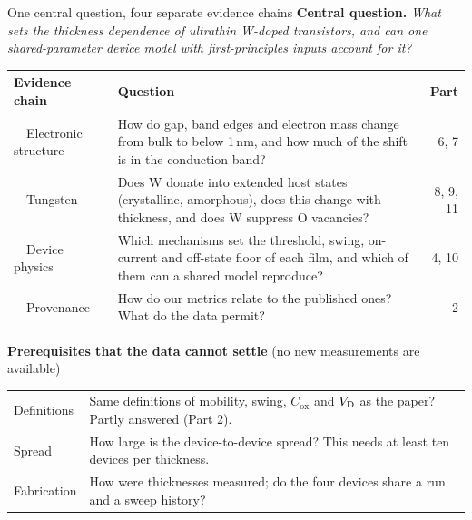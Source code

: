 \begin{frame}{One central question, four separate evidence chains}
  \threeTop
  \begingroup\small\textbf{Central question.} \emph{What sets the thickness dependence of ultrathin W-doped \InO{}
    transistors, and can one shared-parameter device model with first-principles inputs account for it?}\par\endgroup
  \vspace{1mm}
  \begingroup\footnotesize
  \renewcommand{\arraystretch}{1.0}
  \begin{tabularx}{\textwidth}{@{}>{\raggedright\arraybackslash}p{2.8cm}>{\raggedright\arraybackslash}X r@{}}
    \toprule
    Evidence chain & Question & Part \\
    \midrule
    1\ \ Electronic structure & How do gap, band edges and electron mass change from bulk to below 1\,nm, and how much
      of the shift is in the conduction band? & 6, 7 \\\addlinespace[0.3mm]
    2\ \ Tungsten & Does W donate into extended host states (crystalline, amorphous), does this change with
      thickness, and does W suppress O vacancies? & 8, 9, 11 \\\addlinespace[0.3mm]
    3\ \ Device physics & Which mechanisms set the threshold, swing, on-current and off-state floor of each film, and
      which of them can a shared model reproduce? & 4, 10 \\\addlinespace[0.3mm]
    4\ \ Provenance & How do our metrics relate to the published ones? What do the data permit? & 2 \\
    \bottomrule
  \end{tabularx}\par\endgroup
  \vspace{1.6mm}
  \begingroup\footnotesize\textbf{Prerequisites that the data cannot settle} (no new measurements are available)\par
  \vspace{0.6mm}
  \begin{tabularx}{\textwidth}{@{}l>{\raggedright\arraybackslash}X@{}}
    Definitions & Same definitions of mobility, swing, $C_\mathrm{ox}$ and $V_{\mathrm{D}}$ as the paper? Partly answered (Part 2). \\
    Spread & How large is the device-to-device spread? This needs at least ten devices per thickness. \\
    Fabrication & How were thicknesses measured; do the four devices share a run and a sweep history? \\
  \end{tabularx}\par\endgroup
\end{frame}

